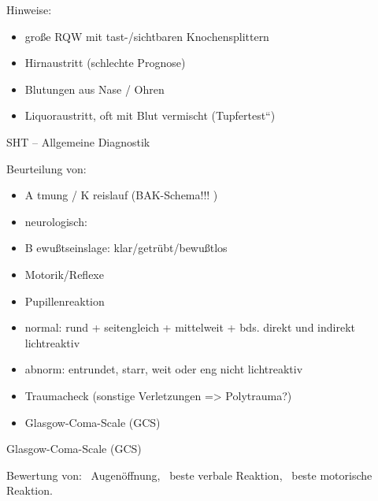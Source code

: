 \documentclass{article}
\begin{document}
Hinweise:

\begin{itemize}
\item gro{\ss}e RQW mit tast-/sichtbaren  Knochensplittern

\item Hirnaustritt (schlechte Prognose)

\item Blutungen aus Nase / Ohren

\item Liquoraustritt, oft mit Blut vermischt 
({\quotedblbase}Tupfertest{\textquotedblleft})

\end{itemize}
SHT -- Allgemeine Diagnostik

Beurteilung von:

\begin{itemize}
\item A tmung / K reislauf  (BAK-Schema!!! )

\item neurologisch:

\end{itemize}
\begin{itemize}
\item B ewu{\ss}tseinslage: klar/getr\"ubt/bewu{\ss}tlos

\item Motorik/Reflexe

\item Pupillenreaktion 

\end{itemize}
\begin{itemize}
\item normal: rund + seitengleich + mittelweit + bds.  direkt und
indirekt lichtreaktiv

\item abnorm: entrundet, starr, weit oder eng nicht  lichtreaktiv

\end{itemize}
\begin{itemize}
\item Traumacheck (sonstige Verletzungen ={\textgreater}  Polytrauma?)

\item Glasgow-Coma-Scale (GCS)

\end{itemize}
Glasgow-Coma-Scale (GCS)

Bewertung von: {\textperiodcentered}~Augen\"offnung,
{\textperiodcentered}~beste verbale Reaktion,
{\textperiodcentered}~beste motorische Reaktion.
\end{document}
